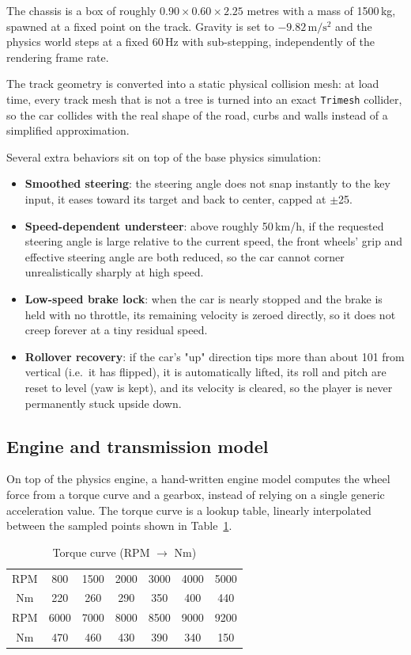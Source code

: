 \documentclass[11pt]{article}
\begin{document}
The chassis is a box of roughly $0.90 \times 0.60 \times 2.25$ metres with a
mass of 1500\,kg, spawned at a fixed point on the track. Gravity is set to
$-9.82\,\mathrm{m/s^2}$ and the physics world steps at a fixed 60\,Hz with
sub-stepping, independently of the rendering frame rate.

The track geometry is converted into a static physical collision mesh: at
load time, every track mesh that is not a tree is turned into an exact
\texttt{Trimesh} collider, so the car collides with the real shape of the
road, curbs and walls instead of a simplified approximation.

Several extra behaviors sit on top of the base physics simulation:
\begin{itemize}
    \item \textbf{Smoothed steering}: the steering angle does not snap
    instantly to the key input, it eases toward its target and back to
    center, capped at $\pm$25\textdegree{}.
    \item \textbf{Speed-dependent understeer}: above roughly 50\,km/h, if
    the requested steering angle is large relative to the current speed,
    the front wheels' grip and effective steering angle are both reduced,
    so the car cannot corner unrealistically sharply at high speed.
    \item \textbf{Low-speed brake lock}: when the car is nearly stopped and
    the brake is held with no throttle, its remaining velocity is zeroed
    directly, so it does not creep forever at a tiny residual speed.
    \item \textbf{Rollover recovery}: if the car's "up" direction tips more
    than about 101\textdegree{} from vertical (i.e.\ it has flipped), it
    is automatically lifted, its roll and pitch are reset to level (yaw is
    kept), and its velocity is cleared, so the player is never permanently
    stuck upside down.
\end{itemize}

\subsection{Engine and transmission model}
On top of the physics engine, a hand-written engine model computes the
wheel force from a torque curve and a gearbox, instead of relying on a
single generic acceleration value. The torque curve is a lookup table,
linearly interpolated between the sampled points shown in
Table~\ref{tab:torque}.

\begin{table}[h]
\centering
\caption{Torque curve (RPM $\rightarrow$ Nm)}
\label{tab:torque}
\begin{tabular}{ccccccc}
\toprule
RPM & 800 & 1500 & 2000 & 3000 & 4000 & 5000 \\
Nm & 220 & 260 & 290 & 350 & 400 & 440 \\
\midrule
RPM & 6000 & 7000 & 8000 & 8500 & 9000 & 9200 \\
Nm & 470 & 460 & 430 & 390 & 340 & 150 \\
\bottomrule
\end{tabular}
\end{table}
\end{document}

